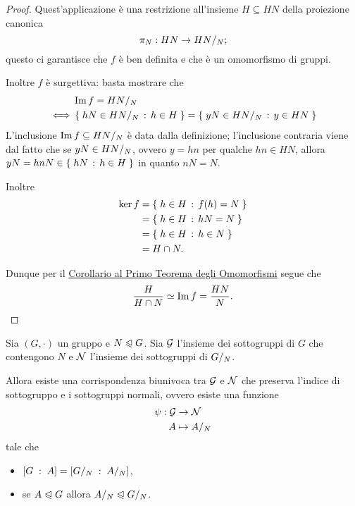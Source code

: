 \begin{proof}
    Quest'applicazione è una restrizione all'insieme $H \subseteq HN$ della proiezione canonica \[
        \pi_{N} : HN \to {HN}/_{N};    
    \] questo ci garantisce che $f$ è ben definita e che è un omomorfismo di gruppi.
    
    Inoltre $f$ è surgettiva: basta mostrare che \begin{align*}
        &\operatorname{Im} f = {HN}/_{N}\\
        \iff &\left\{\;hN \in {HN}/_{N} \,:\, h \in H\;\right\} = \left\{\;yN \in {HN}/_{N} \,:\, y \in HN\;\right\}
    \end{align*}
    L'inclusione $\operatorname{Im} f \subseteq {HN}/_{N}$ è data dalla definizione; l'inclusione contraria viene dal fatto che se $yN \in {HN}/_{N}$, ovvero $y = hn$ per qualche $hn \in HN$, allora $yN = hnN \in \left\{\;hN \,:\, h \in H\;\right\}$ in quanto $nN = N$.

    Inoltre \begin{align*}
        \ker f &= \left\{\;h \in H \,:\, f(h) = N\;\right\} \\
        &= \left\{\;h \in H \,:\, hN = N\;\right\} \\
        &= \left\{\;h \in H \,:\, h \in N\;\right\} \\
        &= H \cap N.
    \end{align*}

    Dunque per il \hyperref[cor:G/ker=Imm]{Corollario al Primo Teorema degli Omomorfismi} segue che \[
        \frac{H}{H \cap N} \simeq \operatorname{Im} f = \frac{HN}{N}. \qedhere    
    \]
\end{proof}


\begin{theorem}
    Sia $(G, \cdot)$ un gruppo e $N \trianglelefteqslant G$. Sia $\mathcal{G}$ l'insieme dei sottogruppi di $G$ che contengono $N$ e $\mathcal{N}$ l'insieme dei sottogruppi di ${G}/_{N}$.

    Allora esiste una corrispondenza biunivoca tra $\mathcal{G}$ e $\mathcal{N}$ che preserva l'indice di sottogruppo e i sottogruppi normali, ovvero esiste una funzione \begin{align*}
        \begin{split}
            \psi : \mathcal{G} &\to \mathcal{N}\\
            A &\mapsto {A}/_{N}
        \end{split}
    \end{align*}    
    tale che \begin{itemize}
        \item $\left[G\;:\;A\right] = \left[{G}/_{N}\;:\;{A}/_{N}\right]$,
        \item se $A \trianglelefteqslant G$ allora ${A}/_{N} \trianglelefteqslant {G}/_{N}$.
    \end{itemize}
\end{theorem}